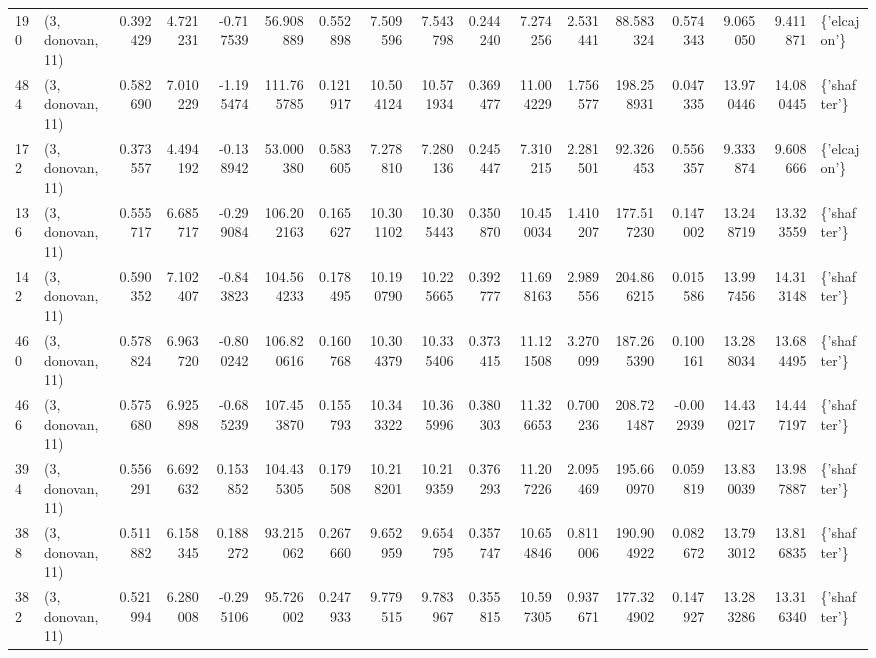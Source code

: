\begin{tabular}{llrrrrrrrrrrrrrrl}
190 &  (3, donovan, 11) &   0.392429 &   4.721231 &  -0.717539 &    56.908889 &   0.552898 &   7.509596 &   7.543798 &  0.244240 &   7.274256 &   2.531441 &    88.583324 &   0.574343 &   9.065050 &   9.411871 &  \{'elcajon'\} \\
484 &  (3, donovan, 11) &   0.582690 &   7.010229 &  -1.195474 &   111.765785 &   0.121917 &  10.504124 &  10.571934 &  0.369477 &  11.004229 &   1.756577 &   198.258931 &   0.047335 &  13.970446 &  14.080445 &  \{'shafter'\} \\
172 &  (3, donovan, 11) &   0.373557 &   4.494192 &  -0.138942 &    53.000380 &   0.583605 &   7.278810 &   7.280136 &  0.245447 &   7.310215 &   2.281501 &    92.326453 &   0.556357 &   9.333874 &   9.608666 &  \{'elcajon'\} \\
136 &  (3, donovan, 11) &   0.555717 &   6.685717 &  -0.299084 &   106.202163 &   0.165627 &  10.301102 &  10.305443 &  0.350870 &  10.450034 &   1.410207 &   177.517230 &   0.147002 &  13.248719 &  13.323559 &  \{'shafter'\} \\
142 &  (3, donovan, 11) &   0.590352 &   7.102407 &  -0.843823 &   104.564233 &   0.178495 &  10.190790 &  10.225665 &  0.392777 &  11.698163 &   2.989556 &   204.866215 &   0.015586 &  13.997456 &  14.313148 &  \{'shafter'\} \\
460 &  (3, donovan, 11) &   0.578824 &   6.963720 &  -0.800242 &   106.820616 &   0.160768 &  10.304379 &  10.335406 &  0.373415 &  11.121508 &   3.270099 &   187.265390 &   0.100161 &  13.288034 &  13.684495 &  \{'shafter'\} \\
466 &  (3, donovan, 11) &   0.575680 &   6.925898 &  -0.685239 &   107.453870 &   0.155793 &  10.343322 &  10.365996 &  0.380303 &  11.326653 &   0.700236 &   208.721487 &  -0.002939 &  14.430217 &  14.447197 &  \{'shafter'\} \\
394 &  (3, donovan, 11) &   0.556291 &   6.692632 &   0.153852 &   104.435305 &   0.179508 &  10.218201 &  10.219359 &  0.376293 &  11.207226 &   2.095469 &   195.660970 &   0.059819 &  13.830039 &  13.987887 &  \{'shafter'\} \\
388 &  (3, donovan, 11) &   0.511882 &   6.158345 &   0.188272 &    93.215062 &   0.267660 &   9.652959 &   9.654795 &  0.357747 &  10.654846 &   0.811006 &   190.904922 &   0.082672 &  13.793012 &  13.816835 &  \{'shafter'\} \\
382 &  (3, donovan, 11) &   0.521994 &   6.280008 &  -0.295106 &    95.726002 &   0.247933 &   9.779515 &   9.783967 &  0.355815 &  10.597305 &   0.937671 &   177.324902 &   0.147927 &  13.283286 &  13.316340 &  \{'shafter'\} \\

\end{tabular}
